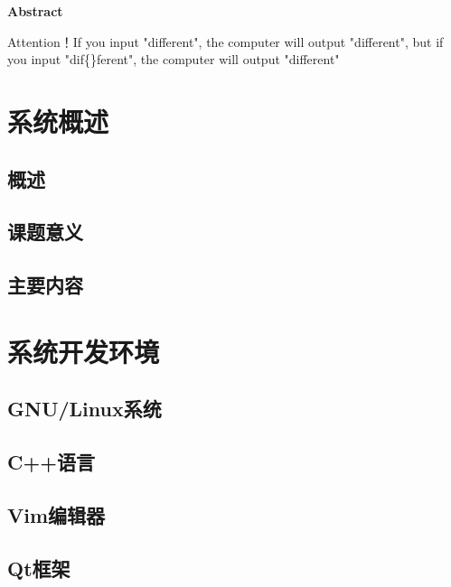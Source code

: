 \documentclass[12pt,a4paper]{article}%
\begin{document}
\begin{center}%
	{\textbf{Abstract}}%
\end{center}
\begin{adjustwidth}{1.06cm}{1.06cm}%
	\hspace{1.5em}Attention！If you input "dif{}ferent", the computer will output "different", but if you input "dif\{\}ferent", the computer will output "dif{}ferent"
\end{adjustwidth}

\newpage%

\tableofcontents
\newpage

\fancyfoot[C]{\thepage} %
\setcounter{page}{1} %

\section{系统概述}
\subsection{概述}
\subsection{课题意义}
\subsection{主要内容}

\newpage

\section{系统开发环境}
\subsection{GNU/Linux系统}
\subsection{C++语言}
\subsection{Vim编辑器}
\subsection{Qt框架}
\end{document}

